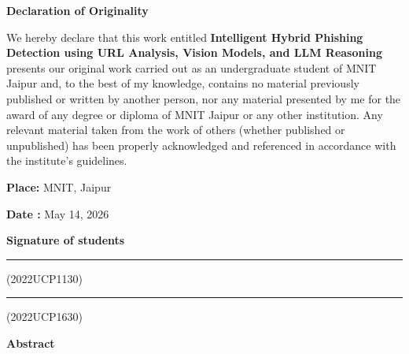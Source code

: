 \documentclass[12pt,a4paper]{report}
\begin{document}
\newpage
\thispagestyle{fancy}

\begin{center}
    {\fontsize{25}{32}\selectfont\bfseries Declaration of Originality}
\end{center}

\vspace{1.5cm}

We hereby declare that this work entitled \textbf{Intelligent Hybrid Phishing
Detection using URL Analysis, Vision Models, and LLM Reasoning} presents our original work carried out as an undergraduate student of MNIT Jaipur and, to the best of my knowledge, contains no material previously published or written by another person, nor any material presented by me for the award of any degree or diploma of MNIT Jaipur or any other institution. Any relevant material taken from the work of others (whether published or unpublished) has been properly acknowledged and referenced in accordance with the institute's guidelines.

\vspace{2cm}

\noindent
\begin{minipage}[t]{0.48\textwidth}
    \textbf{Place:} MNIT, Jaipur
    
    \textbf{Date :} May 14, 2026
\end{minipage}
\hfill
\begin{minipage}[t]{0.38\textwidth}
    \centering
    \textbf{Signature of students}
    
    \vspace{1.2cm}
    
    \rule{4cm}{0.4pt}(2022UCP1130)
    
    \vspace{1.2cm}
    
    \rule{4cm}{0.4pt}(2022UCP1630)
\end{minipage}

\newpage
\thispagestyle{fancy}

\begin{center}
    {\fontsize{25}{32}\selectfont\bfseries Abstract}
\end{center}
\end{document}
